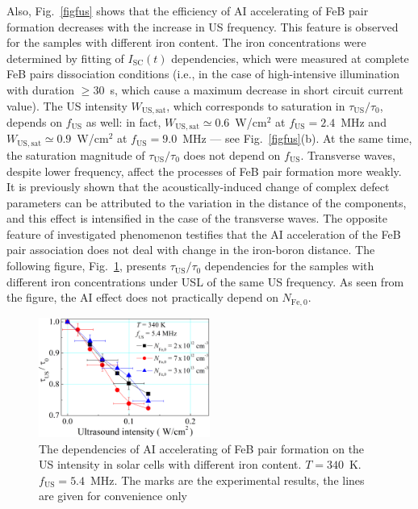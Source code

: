 \documentclass[sn-mathphys]{sn-jnl}%
\theoremstyle{thmstyleone}%
\theoremstyle{thmstyletwo}%
\theoremstyle{thmstylethree}%
\begin{document}
Also, Fig.~\ref{figfus} shows that the efficiency of AI accelerating of FeB pair formation
decreases with the increase in US frequency.
This feature is observed for the samples with different iron content.
The iron concentrations were determined by fitting of $I_\mathrm{SC}(t)$ dependencies, 
which were measured at complete FeB pairs dissociation conditions
(i.e., in the case of high-intensive illumination with duration $\geq 30$~s,
which cause a maximum decrease in short circuit current value).
The US intensity $W_\mathrm{US,sat}$, which corresponds to saturation in
$\tau_\mathrm{US}/\tau_{0}$, depends on $f_\mathrm{US}$ as well:
in fact, $W_\mathrm{US,sat}\simeq0.6$~W/cm$^2$ at $f_\mathrm{US}=2.4$~MHz
and $W_\mathrm{US,sat}\simeq0.9$~W/cm$^2$ at $f_\mathrm{US}=9.0$~MHz --- see Fig.~\ref{figfus}(b).
At the same time, the saturation magnitude of $\tau_\mathrm{US}/\tau_{0}$ does not depend on $f_\mathrm{US}$.
Transverse waves, despite lower frequency, affect the processes of FeB pair formation more weakly.
It is previously shown \cite{Olikh2018SM} that the acoustically-induced change of complex defect parameters can be attributed to the variation in the distance of the components, and this effect is intensified in the case of the transverse waves.
The opposite feature of investigated phenomenon testifies that the AI acceleration of the FeB pair
association does not deal with change in the iron-boron distance.
The following figure, Fig.~\ref{figNFe}, presents $\tau_\mathrm{US}/\tau_{0}$  dependencies
for the samples with different iron concentrations under USL of the same US frequency.
As seen from the figure, the AI effect does not practically depend on $N_\mathrm{Fe,0}$.

\begin{figure}
\centering
 \includegraphics[width=0.5\textwidth]{Fig5}
\caption{
The dependencies of AI accelerating of FeB pair formation on the US intensity
in solar cells with different iron content.
$T=340$~K.
$f_\mathrm{US}=5.4$~MHz.
The marks are the experimental results, the lines are given for convenience only
}
\label{figNFe}       %
\end{figure}
\end{document}
